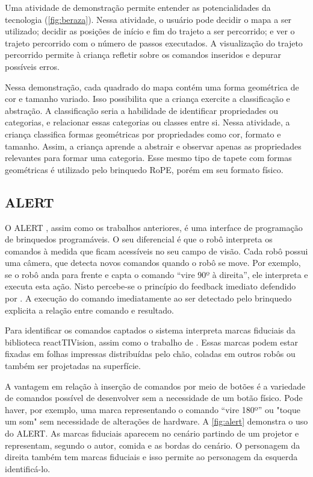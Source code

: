 Uma atividade de demonstração permite entender as potencialidades da tecnologia (\autoref{fig:beraza}). Nessa atividade, o usuário pode decidir o mapa a ser utilizado; decidir as posições de início e fim do trajeto a ser percorrido; e ver o trajeto percorrido com o número de passos executados. A visualização do trajeto percorrido permite à criança refletir sobre os comandos inseridos e depurar possíveis erros.

Nessa demonstração, cada quadrado do mapa contém uma forma geométrica de cor e tamanho variado. Isso possibilita que a criança exercite a classificação e abstração. A classificação seria a habilidade de identificar propriedades ou categorias, e relacionar essas categorias ou classes entre si. Nessa atividade, a criança classifica formas geométricas por propriedades como cor, formato e tamanho. Assim, a criança aprende a abstrair e observar apenas as propriedades relevantes para formar uma categoria. Esse mesmo tipo de tapete com formas geométricas é utilizado pelo brinquedo RoPE, porém em seu formato físico.

\subsection{ALERT}

O ALERT \cite{burleson_active_2018}, assim como os trabalhos anteriores, é uma interface de programação de brinquedos programáveis. O seu diferencial é que o robô interpreta os comandos à medida que ficam acessíveis no seu campo de visão. Cada robô possui uma câmera, que detecta novos comandos quando o robô se move. Por exemplo, se o robô anda para frente e capta o comando “vire 90º à direita”, ele interpreta e executa esta ação. Nisto percebe-se o princípio do feedback imediato defendido por . A execução do comando imediatamente ao ser detectado pelo brinquedo explicita a relação entre comando e resultado.

Para identificar os comandos captados o sistema interpreta marcas fiduciais da biblioteca reactTIVision, assim como o trabalho de . Essas marcas podem estar fixadas em folhas impressas distribuídas pelo chão, coladas em outros robôs ou também ser projetadas na superfície.

A vantagem em relação à inserção de comandos por meio de botões é a variedade de comandos possível de desenvolver sem a necessidade de um botão físico. Pode haver, por exemplo, uma marca representando o comando “vire 180º” ou "toque um som" sem necessidade de alterações de hardware. A \autoref{fig:alert} demonstra o uso do ALERT. As marcas fiduciais aparecem no cenário partindo de um projetor e representam, segundo o autor, comida e as bordas do cenário. O personagem da direita também tem marcas fiduciais e isso permite ao personagem da esquerda identificá-lo.

